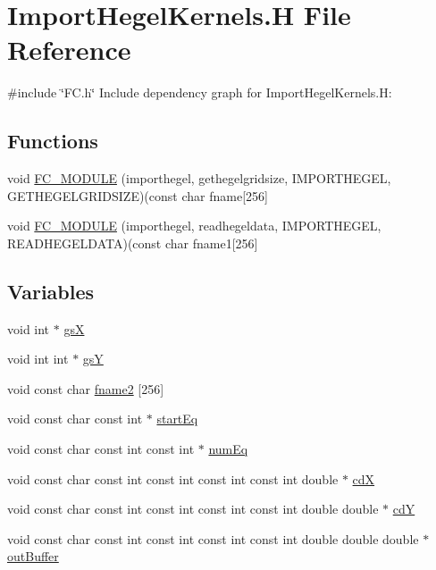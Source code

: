 \hypertarget{ImportHegelKernels_8H}{}\section{Import\+Hegel\+Kernels.\+H File Reference}
\label{ImportHegelKernels_8H}
{\ttfamily \#include \char`\"{}F\+C.\+h\char`\"{}}\newline
Include dependency graph for Import\+Hegel\+Kernels.\+H\+:
\subsection*{Functions}
\begin{DoxyCompactItemize}
\item 
void \hyperlink{ImportHegelKernels_8H_a3bf7a3b6cc46a1d3c52ac69bf2e3b8d4}{F\+C\+\_\+\+M\+O\+D\+U\+LE} (importhegel, gethegelgridsize, I\+M\+P\+O\+R\+T\+H\+E\+G\+EL, G\+E\+T\+H\+E\+G\+E\+L\+G\+R\+I\+D\+S\+I\+ZE)(const char fname\mbox{[}256\mbox{]}
\item 
void \hyperlink{ImportHegelKernels_8H_a88d1d426ed8fd169ecfe0b6f9dedbb45}{F\+C\+\_\+\+M\+O\+D\+U\+LE} (importhegel, readhegeldata, I\+M\+P\+O\+R\+T\+H\+E\+G\+EL, R\+E\+A\+D\+H\+E\+G\+E\+L\+D\+A\+TA)(const char fname1\mbox{[}256\mbox{]}
\end{DoxyCompactItemize}
\subsection*{Variables}
\begin{DoxyCompactItemize}
\item 
void int $\ast$ \hyperlink{ImportHegelKernels_8H_a952a8708d7ea9d8cf34b900114b5b9c6}{gsX}
\item 
void int int $\ast$ \hyperlink{ImportHegelKernels_8H_a45de1e939a5096b060dd1f010a69271b}{gsY}
\item 
void const char \hyperlink{ImportHegelKernels_8H_a9213fd75f34ddaa22b615f532aea59b0}{fname2} \mbox{[}256\mbox{]}
\item 
void const char const int $\ast$ \hyperlink{ImportHegelKernels_8H_ac76cb674e8152fbd2b1f8beaee0971d1}{start\+Eq}
\item 
void const char const int const int $\ast$ \hyperlink{ImportHegelKernels_8H_aded1b9ea65ac4416cb441082a0e7bfec}{num\+Eq}
\item 
void const char const int const int const int const int double $\ast$ \hyperlink{ImportHegelKernels_8H_a1045ab2a4235f932a263ec730b3827e0}{cdX}
\item 
void const char const int const int const int const int double double $\ast$ \hyperlink{ImportHegelKernels_8H_a5accbb83c789144f72abfbda6e477f88}{cdY}
\item 
void const char const int const int const int const int double double double $\ast$ \hyperlink{ImportHegelKernels_8H_aa378675db886707686ce96c263b21c8d}{out\+Buffer}
\end{DoxyCompactItemize}



